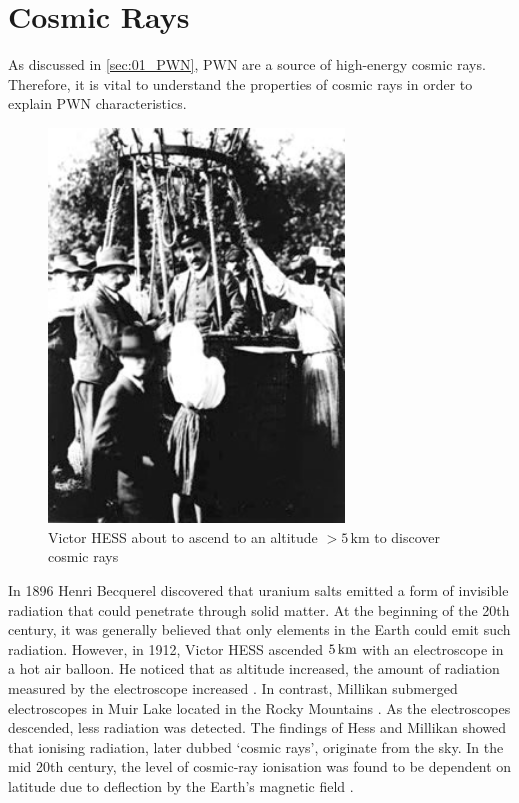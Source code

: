 \section{Cosmic Rays} \label{sec:01_cosmic_rays}

As discussed in \autoref{sec:01_PWN}, PWN are a source of high-energy cosmic rays. Therefore, it is vital to understand the properties of cosmic rays in order to explain PWN characteristics.
\begin{figure}[b!]
	\centering
	\includegraphics[width=0.7\textwidth]{04_Introduction/Images/History/hess_balloon_flight.jpg}
	\caption{Victor HESS about to ascend to an altitude $>5\,\si{\kilo\meter}$ to discover cosmic rays \citep{hess1912observations}}
	\label{fig:chapter1_hess_balloon_flight}
\end{figure}
\newpar 
In 1896 Henri Becquerel discovered that uranium salts emitted a form of invisible radiation that could penetrate through solid matter. At the beginning of the 20th century, it was generally believed that only elements in the Earth could emit such radiation. However, in 1912, Victor HESS ascended $5\,\si{\kilo\meter}$ with an electroscope in a hot air balloon. He noticed that as altitude increased, the amount of radiation measured by the electroscope increased \citep{hess1912observations}. In contrast, Millikan submerged electroscopes in Muir Lake located in the Rocky Mountains \citep{1926PhRv...28..851M}.  As the electroscopes descended, less radiation was detected. The findings of Hess and Millikan showed that ionising radiation, later dubbed `cosmic rays', originate from the sky. In the mid 20th century, the level of cosmic-ray ionisation was found to be dependent on latitude due to deflection by the Earth's magnetic field \citep{1960Natur.187.1099S}.
